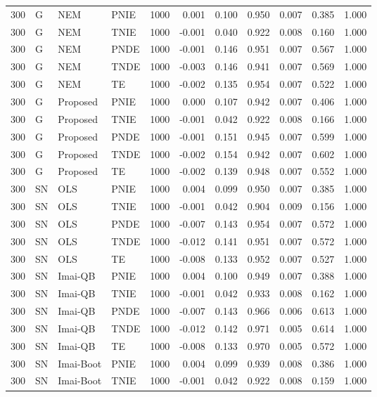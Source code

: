 \begin{longtable}{rlllrrrrrrr}
300 & G & NEM & PNIE & 1000 & 0.001 & 0.100 & 0.950 & 0.007 & 0.385 & 1.000 \\
300 & G & NEM & TNIE & 1000 & -0.001 & 0.040 & 0.922 & 0.008 & 0.160 & 1.000 \\
300 & G & NEM & PNDE & 1000 & -0.001 & 0.146 & 0.951 & 0.007 & 0.567 & 1.000 \\
300 & G & NEM & TNDE & 1000 & -0.003 & 0.146 & 0.941 & 0.007 & 0.569 & 1.000 \\
300 & G & NEM & TE & 1000 & -0.002 & 0.135 & 0.954 & 0.007 & 0.522 & 1.000 \\
300 & G & Proposed & PNIE & 1000 & 0.000 & 0.107 & 0.942 & 0.007 & 0.406 & 1.000 \\
300 & G & Proposed & TNIE & 1000 & -0.001 & 0.042 & 0.922 & 0.008 & 0.166 & 1.000 \\
300 & G & Proposed & PNDE & 1000 & -0.001 & 0.151 & 0.945 & 0.007 & 0.599 & 1.000 \\
300 & G & Proposed & TNDE & 1000 & -0.002 & 0.154 & 0.942 & 0.007 & 0.602 & 1.000 \\
300 & G & Proposed & TE & 1000 & -0.002 & 0.139 & 0.948 & 0.007 & 0.552 & 1.000 \\
300 & SN & OLS & PNIE & 1000 & 0.004 & 0.099 & 0.950 & 0.007 & 0.385 & 1.000 \\
300 & SN & OLS & TNIE & 1000 & -0.001 & 0.042 & 0.904 & 0.009 & 0.156 & 1.000 \\
300 & SN & OLS & PNDE & 1000 & -0.007 & 0.143 & 0.954 & 0.007 & 0.572 & 1.000 \\
300 & SN & OLS & TNDE & 1000 & -0.012 & 0.141 & 0.951 & 0.007 & 0.572 & 1.000 \\
300 & SN & OLS & TE & 1000 & -0.008 & 0.133 & 0.952 & 0.007 & 0.527 & 1.000 \\
300 & SN & Imai-QB & PNIE & 1000 & 0.004 & 0.100 & 0.949 & 0.007 & 0.388 & 1.000 \\
300 & SN & Imai-QB & TNIE & 1000 & -0.001 & 0.042 & 0.933 & 0.008 & 0.162 & 1.000 \\
300 & SN & Imai-QB & PNDE & 1000 & -0.007 & 0.143 & 0.966 & 0.006 & 0.613 & 1.000 \\
300 & SN & Imai-QB & TNDE & 1000 & -0.012 & 0.142 & 0.971 & 0.005 & 0.614 & 1.000 \\
300 & SN & Imai-QB & TE & 1000 & -0.008 & 0.133 & 0.970 & 0.005 & 0.572 & 1.000 \\
300 & SN & Imai-Boot & PNIE & 1000 & 0.004 & 0.099 & 0.939 & 0.008 & 0.386 & 1.000 \\
300 & SN & Imai-Boot & TNIE & 1000 & -0.001 & 0.042 & 0.922 & 0.008 & 0.159 & 1.000 \\

\end{longtable}
